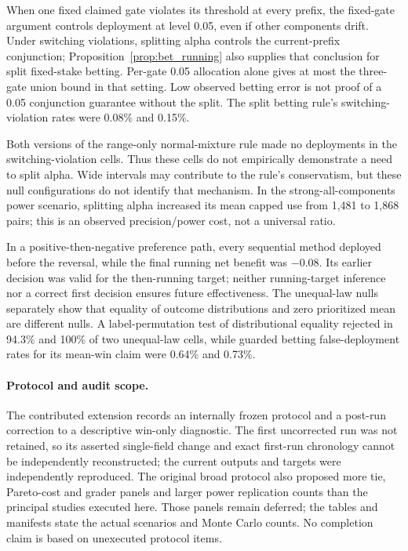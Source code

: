 When one fixed claimed gate violates its threshold at every prefix,
the fixed-gate argument controls deployment at level 0.05, even if
other components drift. Under switching violations, splitting alpha
controls the current-prefix conjunction; Proposition~\ref{prop:bet_running}
also supplies that conclusion for split fixed-stake betting.
Per-gate 0.05 allocation alone gives at most the three-gate union bound
in that setting. Low observed betting error is not proof of a 0.05
conjunction guarantee without the split. The split betting rule's
switching-violation rates were 0.08\% and 0.15\%.

Both versions of the range-only normal-mixture rule made no deployments
in the switching-violation cells. Thus these cells do not empirically
demonstrate a need to split alpha. Wide intervals may contribute to the
rule's conservatism, but these null configurations do not identify that
mechanism.
In the strong-all-components power scenario, splitting alpha increased
its mean capped use from 1,481 to 1,868 pairs; this is an observed
precision/power cost, not a universal ratio.

In a positive-then-negative preference path, every sequential method
deployed before the reversal, while the final running net benefit was
$-0.08$. Its earlier decision was valid for the then-running target;
neither running-target inference nor a correct first decision ensures
future effectiveness. The unequal-law nulls separately show that equality
of outcome distributions and zero prioritized mean are different nulls.
A label-permutation test of distributional equality rejected in 94.3\%
and 100\% of two unequal-law cells, while guarded betting false-deployment
rates for its mean-win claim were 0.64\% and 0.73\%.

\paragraph{Protocol and audit scope.}
The contributed extension records an internally frozen protocol and a
post-run correction to a descriptive win-only diagnostic. The first
uncorrected run was not retained, so its asserted single-field change
and exact first-run chronology cannot be independently reconstructed;
the current outputs and targets were independently reproduced. The
original broad protocol also proposed more tie, Pareto-cost and grader
panels and larger power replication counts than the principal studies
executed here. Those panels remain deferred; the tables and manifests
state the actual scenarios and Monte Carlo counts. No completion claim
is based on unexecuted protocol items.
